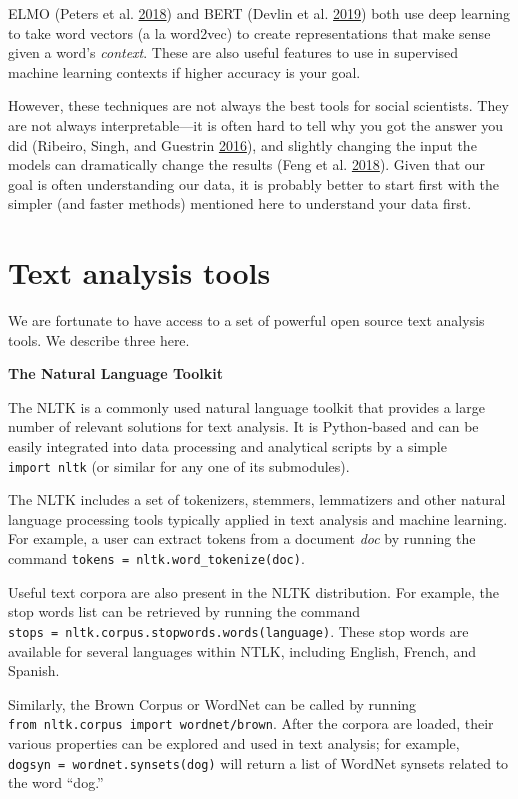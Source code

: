 \documentclass[]{krantz}
\begin{document}
ELMO (Peters et al. \protect\hyperlink{ref-peters-18}{2018}) and BERT
(Devlin et al. \protect\hyperlink{ref-devlin-18}{2019}) both use deep
learning to take word vectors (a la word2vec) to create representations
that make sense given a word's \emph{context}. These are also useful
features to use in supervised machine learning contexts if higher
accuracy is your goal.

However, these techniques are not always the best tools for social
scientists. They are not always interpretable---it is often hard to tell
why you got the answer you did (Ribeiro, Singh, and Guestrin
\protect\hyperlink{ref-ribeiro-16}{2016}), and slightly changing the
input the models can dramatically change the results (Feng et al.
\protect\hyperlink{ref-feng-18}{2018}). Given that our goal is often
understanding our data, it is probably better to start first with the
simpler (and faster methods) mentioned here to understand your data
first.

\section{Text analysis tools}\label{text-analysis-tools}

We are fortunate to have access to a set of powerful open source text
analysis tools. We describe three here.

\textbf{The Natural Language Toolkit}

The NLTK is a commonly used natural language toolkit that provides a
large number of relevant solutions for text analysis. It is Python-based
and can be easily integrated into data processing and analytical scripts
by a simple \texttt{import\ nltk} (or similar for any one of its
submodules).

The NLTK includes a set of tokenizers, stemmers, lemmatizers and other
natural language processing tools typically applied in text analysis and
machine learning. For example, a user can extract tokens from a document
\emph{doc} by running the command
\texttt{tokens\ =\ nltk.word\_tokenize(doc)}.

Useful text corpora are also present in the NLTK distribution. For
example, the stop words list can be retrieved by running the command
\texttt{stops\ =\ nltk.corpus.stopwords.words(language)}. These stop
words are available for several languages within NTLK, including
English, French, and Spanish.

Similarly, the Brown Corpus or WordNet can be called by running
\texttt{from\ nltk.corpus\ import\ wordnet/brown}. After the corpora are
loaded, their various properties can be explored and used in text
analysis; for example,
\texttt{dogsyn\ =\ wordnet.synsets(\textquotesingle{}dog\textquotesingle{})}
will return a list of WordNet synsets related to the word ``dog.''
\end{document}
